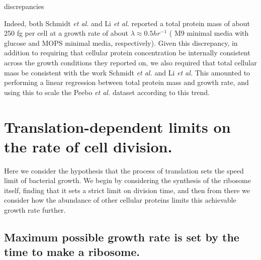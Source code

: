 discrepancies \documentclass[11pt, letterpaper]{article}
\begin{document}
Indeed, both Schmidt {\it et al.} and Li {\it et al.} reported a total protein mass of about
250 fg per cell at a growth rate of about $\lambda \approx 0.5 hr^{-1}$ ( M9
minimal media with glucose and MOPS minimal media, respectively). Given this
discrepancy, in addition to requiring that cellular protein concentration be
internally consistent across the growth conditions they reported on, we also
required that total cellular mass be consistent with the work Schmidt {\it et al.} and
Li {\it et al.} This amounted to performing a linear regression between total protein
mass and growth rate, and using this to scale the Peebo {\it et al.} dataset according
to this trend.



%
\newpage
\section{Translation-dependent limits on the rate of cell division.}

Here we consider the hypothesis that the process of translation sets the speed
limit of bacterial growth. We begin by considering the synthesis of the ribosome
itself, finding that it sets a strict limit on division time, and then from there we
consider how the abundance of other cellular proteins limits this achievable growth rate further.

\subsection{Maximum possible growth rate is set by the time to make a ribosome.}

\end{document}
